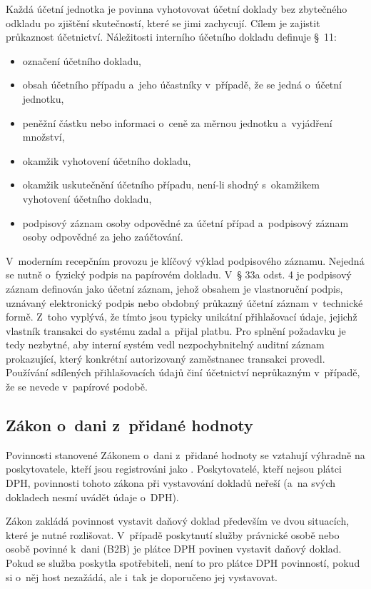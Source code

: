 Každá účetní jednotka je povinna vyhotovovat účetní doklady bez zbytečného odkladu po zjištění skutečností, které se jimi zachycují.
Cílem je zajistit průkaznost účetnictví.
Náležitosti interního účetního dokladu definuje \S~11:
\begin{itemize}
    \item označení účetního dokladu,
    \item obsah účetního případu a~jeho účastníky v~případě, že se jedná o~účetní jednotku,
    \item peněžní částku nebo informaci o~ceně za měrnou jednotku a~vyjádření množství,
    \item okamžik vyhotovení účetního dokladu,
    \item okamžik uskutečnění účetního případu, není-li shodný s~okamžikem vyhotovení účetního dokladu,
    \item podpisový záznam osoby odpovědné za účetní případ a~podpisový záznam osoby odpovědné za jeho zaúčtování.
\end{itemize}
V~moderním recepčním provozu je klíčový výklad podpisového záznamu.
Nejedná se nutně o~fyzický podpis na papírovém dokladu.
V~§ 33a odst. 4 je podpisový záznam definován jako účetní záznam, jehož obsahem je vlastnoruční podpis, uznávaný elektronický podpis nebo obdobný průkazný účetní záznam v~technické formě.
Z~toho vyplývá, že tímto  jsou typicky unikátní přihlašovací údaje, jejichž vlastník transakci do systému zadal a~přijal platbu.
Pro splnění požadavku je tedy nezbytné, aby interní systém vedl nezpochybnitelný auditní záznam prokazující, který konkrétní autorizovaný zaměstnanec transakci provedl.
Používání sdílených přihlašovacích údajů činí účetnictví neprůkazným v~případě, že se nevede v~papírové podobě.

\subsection{Zákon o~dani z~přidané hodnoty}
Povinnosti stanovené Zákonem o~dani z~přidané hodnoty \cite{cz-2004-235} se vztahují výhradně na poskytovatele, kteří jsou registrováni jako .
Poskytovatelé, kteří nejsou plátci DPH, povinnosti tohoto zákona při vystavování dokladů neřeší (a~na svých dokladech nesmí uvádět údaje o~DPH).

Zákon zakládá povinnost vystavit daňový doklad především ve dvou situacích, které je nutné rozlišovat.
V~případě poskytnutí služby právnické osobě nebo osobě povinné k~dani (B2B) je plátce DPH povinen vystavit daňový doklad.
Pokud se služba poskytla spotřebiteli, není to pro plátce DPH povinností, pokud si o~něj host nezažádá, ale i~tak je doporučeno jej vystavovat.


